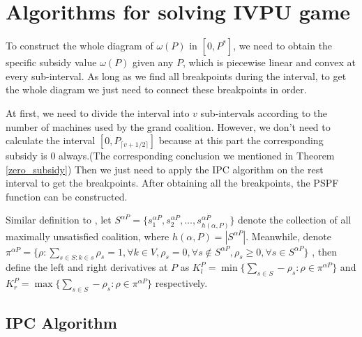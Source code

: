 \section{Algorithms for solving IVPU game}
To construct the whole diagram of $\omega(P)$ in $[0,P^*]$, we need to obtain the specific subsidy value $\omega(P)$ given any $P$, which is piecewise linear and convex at every sub-interval. As long as we find all breakpoints during the interval, to get the whole diagram we just need to connect these breakpoints in order.

At first, we need to divide the interval into $v$ sub-intervals according to the number of machines used by the grand coalition. However, we don't need to calculate the interval $[0,P_{\lceil v+1/2 \rceil}]$ because at this part the corresponding subsidy is 0 always.(The corresponding conclusion we mentioned in Theorem \ref{zero_subsidy})
Then we just need to apply the IPC algorithm on the rest interval to get the breakpoints. After obtaining all the breakpoints, the PSPF function can be constructed.

Similar definition to \cite{liu2018simultaneous}, let $S^{\alpha P} = \{s_1^{\alpha P}, s_2^{\alpha P}, \ldots, s_{h(\alpha,P)}^{\alpha P}\}$ denote the collection of all maximally unsatisfied coalition, where $h(\alpha,P)= |S^{\alpha P}|$. Meanwhile, denote $\pi^{\alpha P} = \{ \rho:\sum_{s\in S:k\in s}\rho_s=1,\forall k \in V, \rho_s = 0,\forall s \notin S^{\alpha P}, \rho_s\geq 0,\forall s \in S^{\alpha P}\}$
, then define the left and right derivatives at $P$ as $K_{l}^{P} = \min\{\sum_{s\in S} -\rho_s: \rho \in \pi^{\alpha P}\}$ and $K_{r}^{P} = \max\{\sum_{s\in S} -\rho_s: \rho \in \pi^{\alpha P}\}$ respectively.

\subsection{IPC Algorithm}

